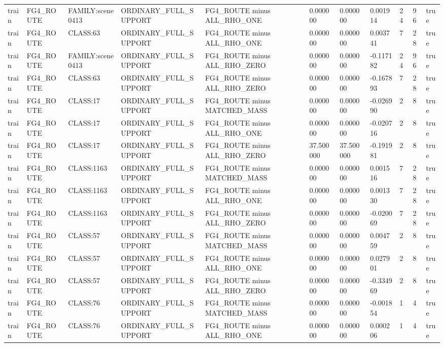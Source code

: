 \begin{tabular}{lllllllllll}
train & FG4\_ROUTE & FAMILY:scene0413 & ORDINARY\_FULL\_SUPPORT & FG4\_ROUTE minus ALL\_RHO\_ONE & 0.000000 & 0.000000 & 0.001914 & 24 & 96 & true \\
train & FG4\_ROUTE & CLASS:63 & ORDINARY\_FULL\_SUPPORT & FG4\_ROUTE minus ALL\_RHO\_ONE & 0.000000 & 0.000000 & 0.003741 & 7 & 28 & true \\
train & FG4\_ROUTE & FAMILY:scene0413 & ORDINARY\_FULL\_SUPPORT & FG4\_ROUTE minus ALL\_RHO\_ZERO & 0.000000 & 0.000000 & -0.117182 & 24 & 96 & true \\
train & FG4\_ROUTE & CLASS:63 & ORDINARY\_FULL\_SUPPORT & FG4\_ROUTE minus ALL\_RHO\_ZERO & 0.000000 & 0.000000 & -0.167893 & 7 & 28 & true \\
train & FG4\_ROUTE & CLASS:17 & ORDINARY\_FULL\_SUPPORT & FG4\_ROUTE minus MATCHED\_MASS & 0.000000 & 0.000000 & -0.026990 & 2 & 8 & true \\
train & FG4\_ROUTE & CLASS:17 & ORDINARY\_FULL\_SUPPORT & FG4\_ROUTE minus ALL\_RHO\_ONE & 0.000000 & 0.000000 & -0.020716 & 2 & 8 & true \\
train & FG4\_ROUTE & CLASS:17 & ORDINARY\_FULL\_SUPPORT & FG4\_ROUTE minus ALL\_RHO\_ZERO & 37.500000 & 37.500000 & -0.191981 & 2 & 8 & true \\
train & FG4\_ROUTE & CLASS:1163 & ORDINARY\_FULL\_SUPPORT & FG4\_ROUTE minus MATCHED\_MASS & 0.000000 & 0.000000 & 0.001516 & 7 & 28 & true \\
train & FG4\_ROUTE & CLASS:1163 & ORDINARY\_FULL\_SUPPORT & FG4\_ROUTE minus ALL\_RHO\_ONE & 0.000000 & 0.000000 & 0.001330 & 7 & 28 & true \\
train & FG4\_ROUTE & CLASS:1163 & ORDINARY\_FULL\_SUPPORT & FG4\_ROUTE minus ALL\_RHO\_ZERO & 0.000000 & 0.000000 & -0.020069 & 7 & 28 & true \\
train & FG4\_ROUTE & CLASS:57 & ORDINARY\_FULL\_SUPPORT & FG4\_ROUTE minus MATCHED\_MASS & 0.000000 & 0.000000 & 0.004759 & 2 & 8 & true \\
train & FG4\_ROUTE & CLASS:57 & ORDINARY\_FULL\_SUPPORT & FG4\_ROUTE minus ALL\_RHO\_ONE & 0.000000 & 0.000000 & 0.027901 & 2 & 8 & true \\
train & FG4\_ROUTE & CLASS:57 & ORDINARY\_FULL\_SUPPORT & FG4\_ROUTE minus ALL\_RHO\_ZERO & 0.000000 & 0.000000 & -0.334969 & 2 & 8 & true \\
train & FG4\_ROUTE & CLASS:76 & ORDINARY\_FULL\_SUPPORT & FG4\_ROUTE minus MATCHED\_MASS & 0.000000 & 0.000000 & -0.001854 & 1 & 4 & true \\
train & FG4\_ROUTE & CLASS:76 & ORDINARY\_FULL\_SUPPORT & FG4\_ROUTE minus ALL\_RHO\_ONE & 0.000000 & 0.000000 & 0.000206 & 1 & 4 & true \\

\end{tabular}
